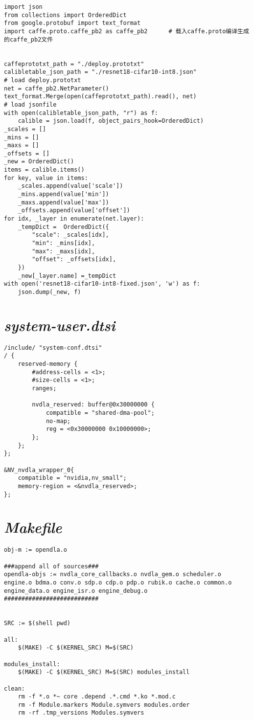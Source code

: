 \lstset{language=Python}
\begin{lstlisting}
import json
from collections import OrderedDict
from google.protobuf import text_format
import caffe.proto.caffe_pb2 as caffe_pb2      # 载入caffe.proto编译生成的caffe_pb2文件


caffeprototxt_path = "./deploy.prototxt"
calibletable_json_path = "./resnet18-cifar10-int8.json"
# load deploy.prototxt
net = caffe_pb2.NetParameter()
text_format.Merge(open(caffeprototxt_path).read(), net)
# load jsonfile
with open(calibletable_json_path, "r") as f:
    calible = json.load(f, object_pairs_hook=OrderedDict)
_scales = []
_mins = []
_maxs = []
_offsets = []
_new = OrderedDict()
items = calible.items()
for key, value in items:
    _scales.append(value['scale'])
    _mins.append(value['min'])
    _maxs.append(value['max'])
    _offsets.append(value['offset'])
for idx, _layer in enumerate(net.layer):
    _tempDict =  OrderedDict({
        "scale": _scales[idx],
        "min": _mins[idx],
        "max": _maxs[idx],
        "offset": _offsets[idx],
    }) 
    _new[_layer.name] =_tempDict
with open('resnet18-cifar10-int8-fixed.json', 'w') as f:
    json.dump(_new, f)
\end{lstlisting}

\section{\emph{system-user.dtsi}}

\begin{lstlisting}
/include/ "system-conf.dtsi"
/ {
    reserved-memory {
        #address-cells = <1>;
        #size-cells = <1>;
        ranges;
    
        nvdla_reserved: buffer@0x30000000 {
            compatible = "shared-dma-pool";
            no-map;
            reg = <0x30000000 0x10000000>;
        };
    };
};

&NV_nvdla_wrapper_0{
    compatible = "nvidia,nv_small";
    memory-region = <&nvdla_reserved>;
};
\end{lstlisting}

\section{\emph{Makefile}}

\begin{lstlisting}
obj-m := opendla.o

###append all of sources###
opendla-objs := nvdla_core_callbacks.o nvdla_gem.o scheduler.o engine.o bdma.o conv.o sdp.o cdp.o pdp.o rubik.o cache.o common.o engine_data.o engine_isr.o engine_debug.o
###########################


SRC := $(shell pwd)

all:
    $(MAKE) -C $(KERNEL_SRC) M=$(SRC)

modules_install:
    $(MAKE) -C $(KERNEL_SRC) M=$(SRC) modules_install

clean:
    rm -f *.o *~ core .depend .*.cmd *.ko *.mod.c
    rm -f Module.markers Module.symvers modules.order
    rm -rf .tmp_versions Modules.symvers
\end{lstlisting}

